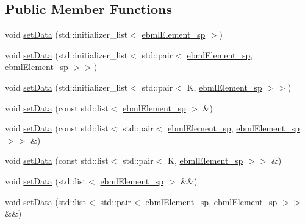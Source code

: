 \subsection*{Public Member Functions}
\begin{DoxyCompactItemize}
\item 
void \mbox{\hyperlink{classebml_1_1ebmlMap_a1d95a8dbda99fb485977f18f0e5ed992}{set\+Data}} (std\+::initializer\+\_\+list$<$ \mbox{\hyperlink{namespaceebml_adad533b7705a16bb360fe56380c5e7be}{ebml\+Element\+\_\+sp}} $>$)
\item 
void \mbox{\hyperlink{classebml_1_1ebmlMap_a0e78920596118890009d9127f0a42c0e}{set\+Data}} (std\+::initializer\+\_\+list$<$ std\+::pair$<$ \mbox{\hyperlink{namespaceebml_adad533b7705a16bb360fe56380c5e7be}{ebml\+Element\+\_\+sp}}, \mbox{\hyperlink{namespaceebml_adad533b7705a16bb360fe56380c5e7be}{ebml\+Element\+\_\+sp}} $>$$>$)
\item 
void \mbox{\hyperlink{classebml_1_1ebmlMap_ae05e1f77c6d1feed3bf2ff874caf1dba}{set\+Data}} (std\+::initializer\+\_\+list$<$ std\+::pair$<$ K, \mbox{\hyperlink{namespaceebml_adad533b7705a16bb360fe56380c5e7be}{ebml\+Element\+\_\+sp}} $>$$>$)
\item 
void \mbox{\hyperlink{classebml_1_1ebmlMap_aee0f35c791ed14dee89d6e81f47ce58e}{set\+Data}} (const std\+::list$<$ \mbox{\hyperlink{namespaceebml_adad533b7705a16bb360fe56380c5e7be}{ebml\+Element\+\_\+sp}} $>$ \&)
\item 
void \mbox{\hyperlink{classebml_1_1ebmlMap_af3dc95ad8188d5f66235dc58ce304251}{set\+Data}} (const std\+::list$<$ std\+::pair$<$ \mbox{\hyperlink{namespaceebml_adad533b7705a16bb360fe56380c5e7be}{ebml\+Element\+\_\+sp}}, \mbox{\hyperlink{namespaceebml_adad533b7705a16bb360fe56380c5e7be}{ebml\+Element\+\_\+sp}} $>$$>$ \&)
\item 
void \mbox{\hyperlink{classebml_1_1ebmlMap_ae3174082f9f1036e040ce94fa7a85ebd}{set\+Data}} (const std\+::list$<$ std\+::pair$<$ K, \mbox{\hyperlink{namespaceebml_adad533b7705a16bb360fe56380c5e7be}{ebml\+Element\+\_\+sp}} $>$$>$ \&)
\item 
void \mbox{\hyperlink{classebml_1_1ebmlMap_aa8168bc50460fb4e3cd704d16dcd071e}{set\+Data}} (std\+::list$<$ \mbox{\hyperlink{namespaceebml_adad533b7705a16bb360fe56380c5e7be}{ebml\+Element\+\_\+sp}} $>$ \&\&)
\item 
void \mbox{\hyperlink{classebml_1_1ebmlMap_aa3a6c46cc3c149337ffbbb796574e11d}{set\+Data}} (std\+::list$<$ std\+::pair$<$ \mbox{\hyperlink{namespaceebml_adad533b7705a16bb360fe56380c5e7be}{ebml\+Element\+\_\+sp}}, \mbox{\hyperlink{namespaceebml_adad533b7705a16bb360fe56380c5e7be}{ebml\+Element\+\_\+sp}} $>$$>$ \&\&)
$$
\end{DoxyCompactItemize}
